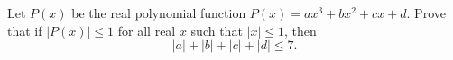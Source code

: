Let $P(x)$ be the real polynomial function $P(x) = ax^3 + bx^2 + cx + d$. Prove that if $|P(x)| \leq 1$ for all real $x$ such that $|x| \leq 1$, then
\[
|a| + |b| + |c| + |d| \leq 7.
\]
